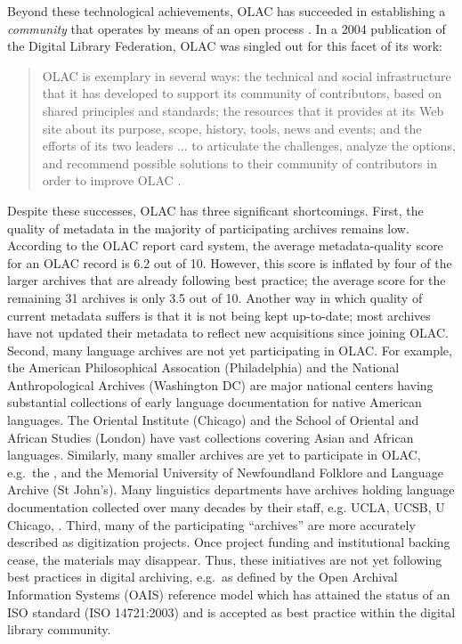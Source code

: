 Beyond these technological achievements, OLAC has succeeded in
establishing a \emph{community} that operates by means of an open
process \citep{OLAC-Process}.  In a 2004 publication of the
Digital Library Federation, OLAC was singled out for this
facet of its work:

\begin{quote} \small
  OLAC is exemplary in several ways: the technical and social
  infrastructure that it has developed to support its community of
  contributors, based on shared principles and standards; the
  resources that it provides at its Web site about its purpose, scope,
  history, tools, news and events; and the efforts of its two leaders
  ... to articulate the challenges, analyze the options, and recommend
  possible solutions to their community of contributors in order to
  improve OLAC \citep{Brogan04}.
\end{quote}


Despite these successes, OLAC has three significant shortcomings.
First, the quality of metadata in the majority of participating archives remains
low.  According to the OLAC report card system, the average 
metadata-quality score for an OLAC record is 6.2 out of 10. However,
this score is
inflated by four of the larger archives that are already
following best practice; the average score for the remaining 31 archives
is only 3.5 out of 10.  Another way in which quality of current metadata suffers is that it is not being kept up-to-date; most archives have not
updated their metadata to reflect new acquisitions since joining OLAC.
Second, many language archives are not yet participating in OLAC.  For
example, the American Philosophical Assocation (Philadelphia) and the
National Anthropological Archives (Washington DC) are major national
centers having substantial collections of early language documentation
for native American languages.  The Oriental Institute (Chicago) and
the School of Oriental and African Studies (London) have vast
collections covering Asian and African languages.  Similarly, many
smaller archives are yet to participate in OLAC, e.g.\ the
\todo{[EXAMPLE]}, and the
Memorial University of Newfoundland Folklore and Language Archive (St
John's).  Many linguistics departments have archives holding language
documentation collected over many decades by their staff, e.g. UCLA,
UCSB, U Chicago, \todo{[MORE]}.
Third, many of the participating ``archives'' are more accurately described
as digitization projects.  Once project funding and institutional
backing cease, the materials may disappear.  Thus, these
initiatives are not yet following best practices in digital archiving,
e.g.\ as defined by the Open Archival Information Systems (OAIS)
reference model \citep{OAIS02} which has attained the status of an ISO
standard (ISO 14721:2003) and is accepted as best practice within the
digital library community.

